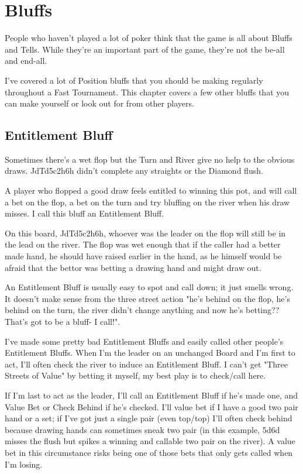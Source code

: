 \chapter{Bluffs}


People who haven't played a lot of poker think that the game
is all about Bluffs and Tells. While they're an important
part of the game, they're not the be-all and end-all. 

I've covered a lot of Position bluffs that you should be making
regularly throughout a Fast Tournament. This chapter covers
a few other bluffs that you can make yourself or look out for
from other players.

\section{Entitlement Bluff}

Sometimes there's a wet flop but the Turn and River give no help
to the obvious draws. JdTd5c2h6h didn't complete any straights
or the Diamond flush.


A player who flopped a good draw feels entitled to winning
this pot, and will call a bet on the flop, a bet on the turn
and try bluffing on the river when his draw misses. I call
this bluff an Entitlement Bluff.

On this board, JdTd5c2h6h, whoever was the leader on the flop
will still be in the lead on the river. The flop was wet enough
that if the caller had a better made hand, he should have raised
earlier in the hand, as he himself would be afraid that the bettor
was betting a drawing hand and might draw out.

An Entitlement Bluff is usually easy to spot and call down; it
just smells wrong. It doesn't make sense from the three street action
"he's behind on the flop, he's behind on the turn, the river
didn't change anything and now he's betting?? That's got to be
a bluff- I call!".

I've made some pretty bad Entitlement Bluffs and easily called
other people's Entitlement Bluffs. When I'm the leader on
an unchanged Board and I'm first to act, I'll often check the
river to induce an Entitlement Bluff. I can't get "Three Streets
of Value" by betting it myself, my best play is to check/call here.

If I'm last to act as the leader, I'll call an Entitlement Bluff
if he's made one, and Value Bet or Check Behind if he's checked.
I'll value bet if I have a good two pair hand or a set; if I've
got just a single pair (even top/top) I'll often check behind
because drawing hands can sometimes sneak two pair (in this example,
5d6d misses the flush but spikes a winning and callable two pair
on the river). A value bet in this circumstance risks being one
of those bets that only gets called when I'm losing.

